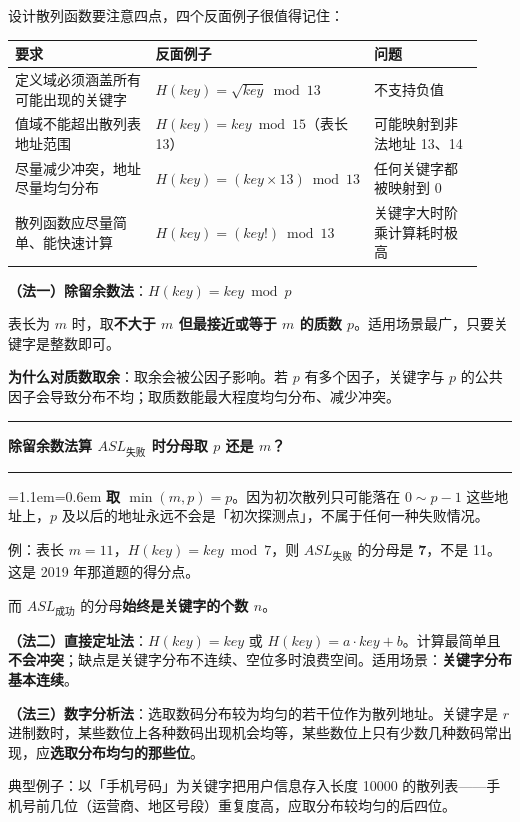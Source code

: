 \documentclass[11pt,openany,UTF8]{ctexbook}
\newcommand{\callouthead}[2]{%
  \par\addvspace{7pt}\noindent
  {\color{#1}\rule[-0.15em]{3pt}{1.05em}}\hspace{0.5em}%
  {\bfseries\color{#1}#2}\par\nobreak\vspace{-0.35em}%
  {\color{rulesep}\hrule height 0.4pt}\nobreak\vspace{0.45em}%
  \begingroup\small\setlength{\parindent}{0pt}%
  \leftskip=1.1em\rightskip=0.6em\noindent\ignorespaces}
\newcommand{\calloutend}{\par\endgroup\addvspace{7pt}}
\newenvironment{callwarn}[1]{\callouthead{warnbar}{#1}}{\calloutend}
\begin{document}
设计散列函数要注意四点，四个反面例子很值得记住：

\begingroup\small\setlength{\tabcolsep}{4.0pt}
\begin{longtable}{@{}L{0.4463\linewidth}L{0.1440\linewidth}L{0.3383\linewidth}@{}}
\toprule
\textbf{要求} & \textbf{反面例子} & \textbf{问题} \\
\midrule
\endhead
定义域必须涵盖所有可能出现的关键字 & $H(key)=\sqrt{key}\bmod 13$ & 不支持负值 \\
值域不能超出散列表地址范围 & $H(key)=key\bmod 15$（表长 13） & 可能映射到非法地址 13、14 \\
尽量减少冲突，地址尽量均匀分布 & $H(key)=(key\times 13)\bmod 13$ & 任何关键字都被映射到 0 \\
散列函数应尽量简单、能快速计算 & $H(key)=(key!)\bmod 13$ & 关键字大时阶乘计算耗时极高 \\
\bottomrule
\end{longtable}
\endgroup

\textbf{（法一）除留余数法}：$H(key)=key\bmod p$

表长为 $m$ 时，取\textbf{不大于 $m$ 但最接近或等于 $m$ 的质数 $p$}。适用场景最广，只要关键字是整数即可。

\textbf{为什么对质数取余}：取余会被公因子影响。若 $p$ 有多个因子，关键字与 $p$ 的公共因子会导致分布不均；取质数能最大程度均匀分布、减少冲突。

\begin{callwarn}{除留余数法算 $ASL_{失败}$ 时分母取 $p$ 还是 $m$？}
\textbf{取 $\min(m,p)=p$}。因为初次散列只可能落在 $0\sim p-1$ 这些地址上，$p$ 及以后的地址永远不会是「初次探测点」，不属于任何一种失败情况。

例：表长 $m=11$，$H(key)=key\bmod 7$，则 $ASL_{失败}$ 的分母是 \textbf{7}，不是 11。这是 2019 年那道题的得分点。

而 $ASL_{成功}$ 的分母\textbf{始终是关键字的个数 $n$}。

\end{callwarn}

\textbf{（法二）直接定址法}：$H(key)=key$ 或 $H(key)=a\cdot key+b$。计算最简单且\textbf{不会冲突}；缺点是关键字分布不连续、空位多时浪费空间。适用场景：\textbf{关键字分布基本连续}。

\textbf{（法三）数字分析法}：选取数码分布较为均匀的若干位作为散列地址。关键字是 $r$ 进制数时，某些数位上各种数码出现机会均等，某些数位上只有少数几种数码常出现，应\textbf{选取分布均匀的那些位}。

典型例子：以「手机号码」为关键字把用户信息存入长度 10000 的散列表——手机号前几位（运营商、地区号段）重复度高，应取分布较均匀的后四位。
\end{document}
